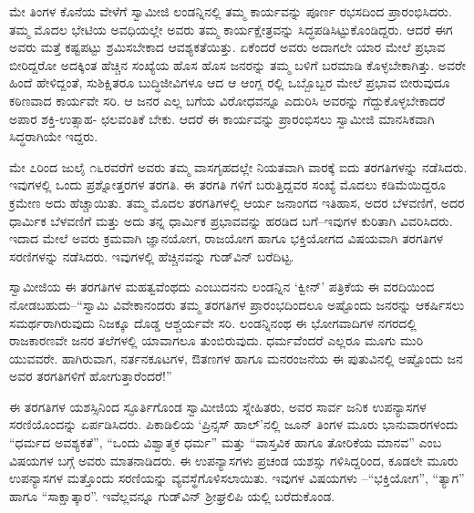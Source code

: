 ಮೇ ತಿಂಗಳ ಕೊನೆಯ ವೇಳೆಗೆ ಸ್ವಾಮೀಜಿ ಲಂಡನ್ನಿನಲ್ಲಿ ತಮ್ಮ ಕಾರ್ಯವನ್ನು ಪೂರ್ಣ ರಭಸದಿಂದ ಪ್ರಾರಂಭಿಸಿದರು. ತಮ್ಮ ಮೊದಲ ಭೇಟಿಯ ಅವಧಿಯಲ್ಲೇ ಅವರು ತಮ್ಮ ಕಾರ್ಯಕ್ಷೇತ್ರವನ್ನು ಸಿದ್ಧಪಡಿಸಿಟ್ಟುಕೊಂಡಿದ್ದರು. ಆದರೆ ಈಗ ಅವರು ಮತ್ತೆ ಕಷ್ಟಪಟ್ಟು ಶ್ರಮಿಸಬೇಕಾದ ಆವಶ್ಯಕತೆಯಿತ್ತು. ಏಕೆಂದರೆ ಅವರು ಅದಾಗಲೇ ಯಾರ ಮೇಲೆ ಪ್ರಭಾವ ಬೀರಿದ್ದರೋ ಅದಕ್ಕಿಂತ ಹೆಚ್ಚಿನ ಸಂಖ್ಯೆಯ ಹೊಸ ಹೊಸ ಜನರನ್ನು ತಮ್ಮ ಬಳಿಗೆ ಬರಮಾಡಿ ಕೊಳ್ಳಬೇಕಾಗಿತ್ತು. ಅವರೇ ಹಿಂದೆ ಹೇಳಿದ್ದಂತೆ, ಸುಶಿಕ್ಷಿತರೂ ಬುದ್ಧಿಜೀವಿಗಳೂ ಆದ ಆ ಆಂಗ್ಲ ರಲ್ಲಿ ಒಬ್ಬೊಬ್ಬರ ಮೇಲೆ ಪ್ರಭಾವ ಬೀರುವುದೂ ಕಠಿಣವಾದ ಕಾರ್ಯವೇ ಸರಿ. ಆ ಜನರ ಎಲ್ಲ ಬಗೆಯ ವಿರೋಧವನ್ನೂ ಎದುರಿಸಿ ಅವರನ್ನು ಗೆದ್ದುಕೊಳ್ಳಬೇಕಾದರೆ ಅಪಾರ ಶಕ್ತಿ-ಉತ್ಸಾಹ- ಛಲವಂತಿಕೆ ಬೇಕು. ಆದರೆ ಈ ಕಾರ್ಯವನ್ನು ಪ್ರಾರಂಭಿಸಲು ಸ್ವಾಮೀಜಿ ಮಾನಸಿಕವಾಗಿ ಸಿದ್ಧರಾಗಿಯೇ ಇದ್ದರು.

ಮೇ ೭ರಿಂದ ಜುಲೈ ೧೬ರವರೆಗೆ ಅವರು ತಮ್ಮ ವಾಸಗೃಹದಲ್ಲೇ ನಿಯತವಾಗಿ ವಾರಕ್ಕೆ ಐದು ತರಗತಿಗಳನ್ನು ನಡೆಸಿದರು. ಇವುಗಳಲ್ಲಿ ಒಂದು ಪ್ರಶ್ನೋತ್ತರಗಳ ತರಗತಿ. ಈ ತರಗತಿ ಗಳಿಗೆ ಬರುತ್ತಿದ್ದವರ ಸಂಖ್ಯೆ ಮೊದಲು ಕಡಿಮೆಯಿದ್ದರೂ ಕ್ರಮೇಣ ಅದು ಹೆಚ್ಚಾಯಿತು. ತಮ್ಮ ಮೊದಲ ತರಗತಿಗಳಲ್ಲಿ ಆರ್ಯ ಜನಾಂಗದ ಇತಿಹಾಸ, ಅದರ ಬೆಳವಣಿಗೆ, ಅದರ ಧಾರ್ಮಿಕ ಬೆಳವಣಿಗೆ ಮತ್ತು ಅದು ತನ್ನ ಧಾರ್ಮಿಕ ಪ್ರಭಾವವನ್ನು ಹರಡಿದ ಬಗೆ–ಇವುಗಳ ಕುರಿತಾಗಿ ವಿವರಿಸಿದರು. ಇದಾದ ಮೇಲೆ ಅವರು ಕ್ರಮವಾಗಿ ಜ್ಞಾನಯೋಗ, ರಾಜಯೋಗ ಹಾಗೂ ಭಕ್ತಿಯೋಗದ ವಿಷಯವಾಗಿ ತರಗತಿಗಳ ಸರಣಿಗಳನ್ನು ನಡೆಸಿದರು. ಇವುಗಳಲ್ಲಿ ಹೆಚ್ಚಿನವನ್ನು ಗುಡ್​ವಿನ್ ಬರೆದಿಟ್ಟ.

ಸ್ವಾಮೀಜಿಯ ಈ ತರಗತಿಗಳ ಮಹತ್ವವೆಂಥದು ಎಂಬುದನನು ಲಂಡನ್ನಿನ ‘ಕ್ವೀನ್​’ ಪತ್ರಿಕೆಯ ಈ ವರದಿಯಿಂದ ನೋಡಬಹುದು–“ಸ್ವಾಮಿ ವಿವೇಕಾನಂದರು ತಮ್ಮ ತರಗತಿಗಳ ಪ್ರಾರಂಭದಿಂದಲೂ ಅಷ್ಟೊಂದು ಜನರನ್ನು ಆಕರ್ಷಿಸಲು ಸಮರ್ಥರಾಗಿರುವುದು ನಿಜಕ್ಕೂ ದೊಡ್ಡ ಆಶ್ಚರ್ಯವೇ ಸರಿ. ಲಂಡನ್ನಿನಂಥ ಈ ಭೋಗವಾದಿಗಳ ನಗರದಲ್ಲಿ ರಾಜಕಾರಣವೇ ಜನರ ತಲೆಗಳಲ್ಲಿ ಯಾವಾಗಲೂ ತುಂಬಿರುವುದು. ಧರ್ಮವೆಂದರೆ ಎಲ್ಲರೂ ಮೂಗು ಮುರಿ ಯುವವರೇ. ಹಾಗಿರುವಾಗ, ನರ್ತನಕೂಟಗಳ, ಔತಣಗಳ ಹಾಗೂ ಮನರಂಜನೆಯ ಈ ಪುತುವಿನಲ್ಲಿ ಅಷ್ಟೊಂದು ಜನ ಅವರ ತರಗತಿಗಳಿಗೆ ಹೋಗುತ್ತಾರೆಂದರೆ!”

ಈ ತರಗತಿಗಳ ಯಶಸ್ಸಿನಿಂದ ಸ್ಫೂರ್ತಿಗೊಂಡ ಸ್ವಾಮೀಜಿಯ ಸ್ನೇಹಿತರು, ಅವರ ಸಾರ್ವ ಜನಿಕ ಉಪನ್ಯಾಸಗಳ ಸರಣಿಯೊಂದನ್ನು ಏರ್ಪಡಿಸಿದರು. ಪಿಕಾಡಿಲಿಯ ‘ಪ್ರಿನ್ಸಸ್ ಹಾಲ್​’ನಲ್ಲಿ ಜೂನ್ ತಿಂಗಳ ಮೂರು ಭಾನುವಾರಗಳಂದು “ಧರ್ಮದ ಅವಶ್ಯಕತೆ”, “ಒಂದು ವಿಶ್ವಾತ್ಮಕ ಧರ್ಮ” ಮತ್ತು “ವಾಸ್ತವಿಕ ಹಾಗೂ ತೋರಿಕೆಯ ಮಾನವ” ಎಂಬ ವಿಷಯಗಳ ಬಗ್ಗೆ ಅವರು ಮಾತನಾಡಿದರು. ಈ ಉಪನ್ಯಾಸಗಳು ಪ್ರಚಂಡ ಯಶಸ್ಸು ಗಳಿಸಿದ್ದರಿಂದ, ಕೂಡಲೇ ಮೂರು ಉಪನ್ಯಾಸಗಳ ಮತ್ತೊಂದು ಸರಣಿಯನ್ನು ವ್ಯವಸ್ಥೆಗೊಳಿಸಲಾಯಿತು. ಇವುಗಳ ವಿಷಯಗಳು –“ಭಕ್ತಿಯೋಗ”, “ತ್ಯಾಗ” ಹಾಗೂ “ಸಾಕ್ಷಾತ್ಕಾರ”. ಇವೆಲ್ಲವನ್ನೂ ಗುಡ್​ವಿನ್ ಶ್ರೀಘ್ರಲಿಪಿ ಯಲ್ಲಿ ಬರೆದುಕೊಂಡ.

